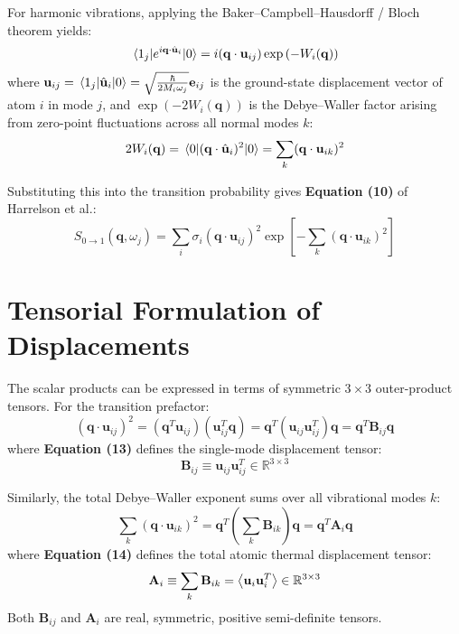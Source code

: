 \documentclass[11pt,a4paper]{article}
\begin{document}
For harmonic vibrations, applying the Baker--Campbell--Hausdorff / Bloch theorem yields:
\begin{equation}
\mel{1_j}{e^{i \mathbf{q} \cdot \hat{\mathbf{u}}_i}}{0} = i (\mathbf{q} \cdot \mathbf{u}_{ij}) \exp\left( -W_i(\mathbf{q}) \right)
\end{equation}
where $\mathbf{u}_{ij} = \mel{1_j}{\hat{\mathbf{u}}_i}{0} = \sqrt{\frac{\hbar}{2 M_i \omega_j}} \mathbf{e}_{ij}$ is the ground-state displacement vector of atom $i$ in mode $j$, and $\exp(-2W_i(\mathbf{q}))$ is the Debye--Waller factor arising from zero-point fluctuations across all normal modes $k$:
\begin{equation}
2 W_i(\mathbf{q}) = \ev{(\mathbf{q} \cdot \hat{\mathbf{u}}_i)^2}{0} = \sum_k (\mathbf{q} \cdot \mathbf{u}_{ik})^2
\end{equation}

Substituting this into the transition probability gives \textbf{Equation (10)} of Harrelson et al.:
\begin{equation}
S_{0 \to 1}(\mathbf{q}, \omega_j) = \sum_i \sigma_i (\mathbf{q} \cdot \mathbf{u}_{ij})^2 \exp\left[ -\sum_k (\mathbf{q} \cdot \mathbf{u}_{ik})^2 \right]
\label{eq:harrelson10}
\end{equation}

\section{Tensorial Formulation of Displacements}

The scalar products can be expressed in terms of symmetric $3 \times 3$ outer-product tensors. For the transition prefactor:
\begin{equation}
(\mathbf{q} \cdot \mathbf{u}_{ij})^2 = (\mathbf{q}^T \mathbf{u}_{ij})(\mathbf{u}_{ij}^T \mathbf{q}) = \mathbf{q}^T (\mathbf{u}_{ij} \mathbf{u}_{ij}^T) \mathbf{q} = \mathbf{q}^T \mathbf{B}_{ij} \mathbf{q}
\end{equation}
where \textbf{Equation (13)} defines the single-mode displacement tensor:
\begin{equation}
\mathbf{B}_{ij} \equiv \mathbf{u}_{ij} \mathbf{u}_{ij}^T \in \mathbb{R}^{3 \times 3}
\end{equation}

Similarly, the total Debye--Waller exponent sums over all vibrational modes $k$:
\begin{equation}
\sum_k (\mathbf{q} \cdot \mathbf{u}_{ik})^2 = \mathbf{q}^T \left( \sum_k \mathbf{B}_{ik} \right) \mathbf{q} = \mathbf{q}^T \mathbf{A}_i \mathbf{q}
\end{equation}
where \textbf{Equation (14)} defines the total atomic thermal displacement tensor:
\begin{equation}
\mathbf{A}_i \equiv \sum_k \mathbf{B}_{ik} = \ev{\mathbf{u}_i \mathbf{u}_i^T} \in \mathbb{R}^{3 \times 3}
\end{equation}
Both $\mathbf{B}_{ij}$ and $\mathbf{A}_i$ are real, symmetric, positive semi-definite tensors.
\end{document}
